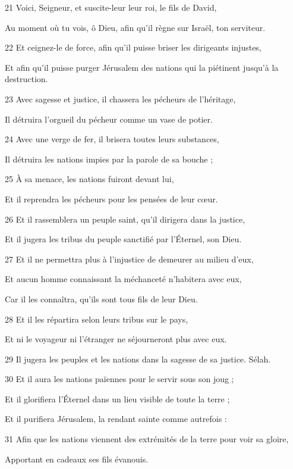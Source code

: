\par 21 Voici, Seigneur, et suscite-leur leur roi, le fils de David,
\par     Au moment où tu vois, ô Dieu, afin qu'il règne sur Israël, ton serviteur.
\par 22 Et ceignez-le de force, afin qu'il puisse briser les dirigeants injustes,
\par     Et afin qu'il puisse purger Jérusalem des nations qui la piétinent jusqu'à la destruction.
\par 23 Avec sagesse et justice, il chassera les pécheurs de l'héritage,
\par     Il détruira l'orgueil du pécheur comme un vase de potier.
\par 24 Avec une verge de fer, il brisera toutes leurs substances,
\par     Il détruira les nations impies par la parole de sa bouche ;
\par 25 À sa menace, les nations fuiront devant lui,
\par     Et il reprendra les pécheurs pour les pensées de leur cœur.
\par   
\par 26 Et il rassemblera un peuple saint, qu'il dirigera dans la justice,
\par     Et il jugera les tribus du peuple sanctifié par l'Éternel, son Dieu.
\par 27 Et il ne permettra plus à l'injustice de demeurer au milieu d'eux,
\par     Et aucun homme connaissant la méchanceté n'habitera avec eux,
\par     Car il les connaîtra, qu'ils sont tous fils de leur Dieu.
\par 28 Et il les répartira selon leurs tribus sur le pays,
\par     Et ni le voyageur ni l'étranger ne séjourneront plus avec eux.
\par 29 Il jugera les peuples et les nations dans la sagesse de sa justice. Sélah.
\par   
\par 30 Et il aura les nations païennes pour le servir sous son joug ;
\par     Et il glorifiera l'Éternel dans un lieu visible de toute la terre ;
\par     Et il purifiera Jérusalem, la rendant sainte comme autrefois :
\par 31 Afin que les nations viennent des extrémités de la terre pour voir sa gloire,
\par     Apportant en cadeaux ses fils évanouis.
